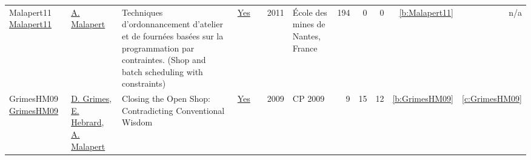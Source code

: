 {\begin{longtable}{>{\raggedright\arraybackslash}p{3cm}>{\raggedright\arraybackslash}p{6cm}>{\raggedright\arraybackslash}p{6.5cm}rrrp{2.5cm}rrrrr}
Malapert11 \href{https://tel.archives-ouvertes.fr/tel-00630122}{Malapert11} & \hyperref[auth:a82]{A. Malapert} & Techniques d'ordonnancement d'atelier et de fourn{\'{e}}es bas{\'{e}}es sur la programmation par contraintes. (Shop and batch scheduling with constraints) & \href{works/Malapert11.pdf}{Yes} & \cite{Malapert11} & 2011 & {\'{E}}cole des mines de Nantes, France & 194 & 0 & 0 & \ref{b:Malapert11} & n/a\\
GrimesHM09 \href{https://doi.org/10.1007/978-3-642-04244-7\_33}{GrimesHM09} & \hyperref[auth:a183]{D. Grimes}, \hyperref[auth:a1]{E. Hebrard}, \hyperref[auth:a82]{A. Malapert} & Closing the Open Shop: Contradicting Conventional Wisdom & \href{works/GrimesHM09.pdf}{Yes} & \cite{GrimesHM09} & 2009 & CP 2009 & 9 & 15 & 12 & \ref{b:GrimesHM09} & \ref{c:GrimesHM09}\\
\end{longtable}
}


